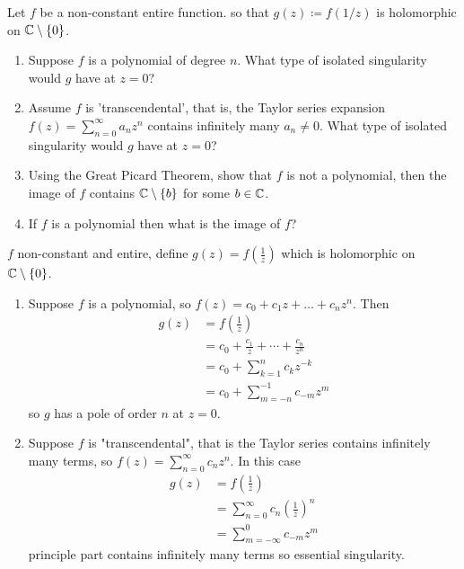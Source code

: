 \documentclass[10pt, a4paper]{article}
\begin{document}
\begin{problem}
    Let $f$ be a non-constant entire function.
    so that $g(z) \coloneqq f(1 / z)$ is holomorphic on $\mathbb{C} \setminus \{0\}$.

    \begin{enumerate}[label = (\roman*)]
        \item Suppose $f$ is a polynomial of degree $n$.
        What type of isolated singularity would $g$ have at $z = 0$?

        \item Assume $f$ is 'transcendental',
        that is,
        the Taylor series expansion $f(z) = \sum_{n = 0}^{\infty}a_nz ^ n$ contains infinitely many $a_n \neq 0$.
        What type of isolated singularity would $g$ have at $z = 0$?

        \item Using the Great Picard Theorem,
        show that $f$ is not a polynomial,
        then the image of $f$ contains $\mathbb{C} \setminus \{b\}$ for some $b \in \mathbb{C}$.

        \item If $f$ is a polynomial then what is the image of $f$?
    \end{enumerate}

    \begin{solution}
        $f$ non-constant and entire,
        define $g(z) = f\left(\frac{1}{z}\right)$ which is holomorphic on $\mathbb{C} \setminus \{0\}$.
        
        \begin{enumerate}[label = (\roman*)]
            \item Suppose $f$ is a polynomial,
            so $f(z) = c_0 + c_1z + \dotsc + c_nz ^ n$.
            Then
            \begin{align*}
                g(z) &= f\left(\frac{1}{z}\right) \\
                &= c_0 + \frac{c_1}{z} + \dotsi + \frac{c_n}{z ^ n} \\
                &= c_0 + \sum_{k = 1}^{n}c_kz ^ {-k} \\
                &= c_0 + \sum_{m = -n}^{-1}c_{-m}z ^ m
            \end{align*}
            so $g$ has a pole of order $n$ at $z = 0$.

            \item Suppose $f$ is "transcendental",
            that is the Taylor series contains infinitely many terms,
            so $f(z) = \sum_{n = 0}^{\infty}c_nz ^ n$.
            In this case
            \begin{align*}
                g(z) &= f\left(\frac{1}{z}\right) \\
                &= \sum_{n = 0}^{\infty}c_n\left(\frac{1}{z}\right) ^ n \\
                &= \sum_{m = -\infty}^{0}c_{-m}z ^ m
            \end{align*}
            principle part contains infinitely many terms so essential singularity.


\end{enumerate}
\end{solution}
\end{problem}
\end{document}
